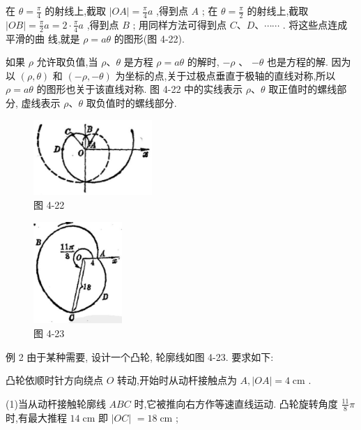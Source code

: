 \documentclass[lang=cn,newtx,12pt,scheme=chinese]{elegantbook}
\begin{document}
在 \(\theta = \frac{\pi }{4}\) 的射线上,截取 \(\left| {OA}\right| = \frac{\pi }{4}a\) ,得到点 \(A\) ; 在 \(\theta = \frac{\pi }{2}\) 的射线上,截取 \(\left| {OB}\right| = \frac{\pi }{2}a = 2 \cdot \frac{\pi }{4}a\) ,得到点 \(B\) ; 用同样方法可得到点 \(C\text{、}D\text{、}\cdots \cdots\) . 将这些点连成平滑的曲 线,就是 \(\rho = {a\theta }\) 的图形(图 4-22).

如果 \(\rho\) 允许取负值,当 \(\rho \text{、}\theta\) 是方程 \(\rho = {a\theta }\) 的解时, \(- \rho\) 、 \(- \theta\) 也是方程的解. 因为以 \(\left( {\rho ,\theta }\right)\) 和 \(\left( {-\rho , - \theta }\right)\) 为坐标的点,关于过极点垂直于极轴的直线对称,所以 \(\rho = {a\theta }\) 的图形也关于该直线对称. 图 4-22 中的实线表示 \(\rho \text{、}\theta\) 取正值时的螺线部分, 虚线表示 \(\rho \text{、}\theta\) 取负值时的螺线部分.

\begin{figure}[h]
  \centering
  \includegraphics[max width=0.4\textwidth]{images/01912cc2-ffb6-728e-9ae7-b113ff05c64b_185_467039.jpg}
  \caption{图 4-22}
\end{figure}

\begin{figure}[h]
  \centering
  \includegraphics[max width=0.3\textwidth]{images/01912cc2-ffb6-728e-9ae7-b113ff05c64b_185_356725.jpg}
  \caption{图 4-23}
\end{figure}

例 2 由于某种需要, 设计一个凸轮, 轮廓线如图 4-23. 要求如下:

凸轮依顺时针方向绕点 \(O\) 转动,开始时从动杆接触点为 \(A,\left| {OA}\right| = 4\mathrm{\;{cm}}\) .

(1)当从动杆接触轮廓线 \({ABC}\) 时,它被推向右方作等速直线运动. 凸轮旋转角度 \(\frac{11}{8}\pi\) 时,有最大推程 \({14}\mathrm{\;{cm}}\) 即 \(\left| {OC}\right|\) \(= {18}\mathrm{\;{cm}}\) ;
\end{document}
